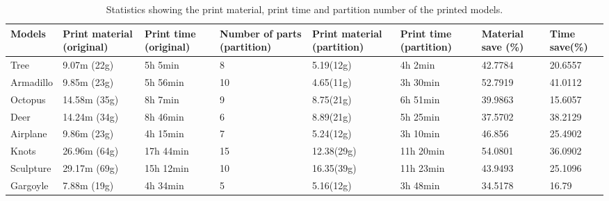 \begin{table}[htb]

\begin{footnotesize}

\begin{center}

    \begin{tabular}{p{1cm} p{2.3cm} p{2.4cm} p{1.81cm} p{2cm} p{1.5cm} p{2cm} p{1.7cm}}

    \hline

     Models& Print material (original)& Print time (original)& Number of parts (partition)& Print material (partition)& Print time (partition)& Material save (\%) &Time save(\%)\\ \hline
     Tree& 9.07m (22g)& 5h 5min & 8 &5.19(12g) & 4h 2min & 42.7784 &20.6557\\ \hline
     Armadillo& 9.85m (23g)& 5h 56min & 10  &4.65(11g) & 3h 30min & 52.7919 &41.0112\\ \hline
     Octopus& 14.58m (35g)& 8h 7min & 9  &8.75(21g) &6h 51min & 39.9863 &15.6057\\ \hline
     Deer& 14.24m (34g)& 8h 46min & 6  &8.89(21g) &5h 25min & 37.5702 &38.2129\\ \hline
     Airplane& 9.86m (23g)& 4h 15min & 7 &5.24(12g) &3h 10min & 46.856 &25.4902\\ \hline
     Knots& 26.96m (64g)& 17h 44min & 15 &12.38(29g) &11h 20min & 54.0801 &36.0902\\ \hline
     Sculpture& 29.17m (69g)& 15h 12min & 10 &16.35(39g) &11h 23min & 43.9493 &25.1096\\ \hline
     Gargoyle& 7.88m (19g)& 4h 34min & 5 &5.16(12g) &3h 48min & 34.5178 &16.79\\ \hline

  \hline

    \end{tabular}

\end{center}

\end{footnotesize}

\caption{Statistics showing the print material, print time and partition number of the printed models.}\label{tab:ertms:summary}

\end{table}




